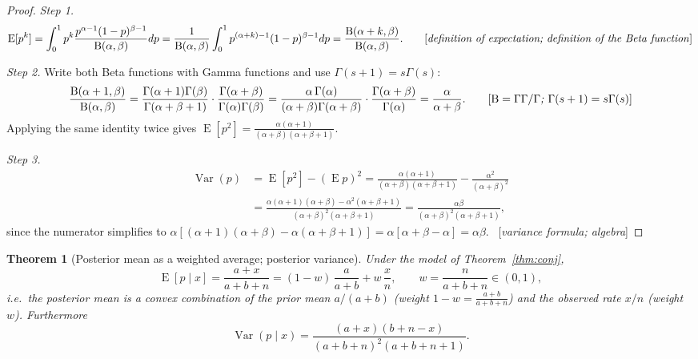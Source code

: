 \documentclass[11pt]{article}
\newtheorem{theorem}{Theorem}
\theoremstyle{definition}
\theoremstyle{remark}
\newcommand{\E}{\operatorname{E}}
\newcommand{\Var}{\operatorname{Var}}
\newcommand{\Bfun}{\mathrm{B}}
\newcommand{\rulename}[1]{\ {[\emph{#1}]}}
\begin{document}
\begin{proof}
\emph{Step 1.}
\[
\E[p^k]=\int_0^1 p^k\frac{p^{\alpha-1}(1-p)^{\beta-1}}{\Bfun(\alpha,\beta)}dp
=\frac{1}{\Bfun(\alpha,\beta)}\int_0^1 p^{(\alpha+k)-1}(1-p)^{\beta-1}dp=\frac{\Bfun(\alpha+k,\beta)}{\Bfun(\alpha,\beta)}.
\tag*{[\emph{definition of expectation; definition of the Beta function}]}
\]

\emph{Step 2.} Write both Beta functions with Gamma functions and use $\Gamma(s+1)=s\Gamma(s)$:
\[
\frac{\Bfun(\alpha+1,\beta)}{\Bfun(\alpha,\beta)}
=\frac{\Gamma(\alpha+1)\Gamma(\beta)}{\Gamma(\alpha+\beta+1)}\cdot\frac{\Gamma(\alpha+\beta)}{\Gamma(\alpha)\Gamma(\beta)}
=\frac{\alpha\,\Gamma(\alpha)}{(\alpha+\beta)\Gamma(\alpha+\beta)}\cdot\frac{\Gamma(\alpha+\beta)}{\Gamma(\alpha)}
=\frac{\alpha}{\alpha+\beta}.
\tag*{[\emph{$\Bfun=\Gamma\Gamma/\Gamma$; $\Gamma(s+1)=s\Gamma(s)$}]}
\]
Applying the same identity twice gives $\E[p^2]=\frac{\alpha(\alpha+1)}{(\alpha+\beta)(\alpha+\beta+1)}$.

\emph{Step 3.}
\begin{align*}
\Var(p)&=\E[p^2]-(\E p)^2
=\frac{\alpha(\alpha+1)}{(\alpha+\beta)(\alpha+\beta+1)}-\frac{\alpha^2}{(\alpha+\beta)^2}\\
&=\frac{\alpha(\alpha+1)(\alpha+\beta)-\alpha^2(\alpha+\beta+1)}{(\alpha+\beta)^2(\alpha+\beta+1)}
=\frac{\alpha\beta}{(\alpha+\beta)^2(\alpha+\beta+1)},
\end{align*}
since the numerator simplifies to $\alpha[(\alpha+1)(\alpha+\beta)-\alpha(\alpha+\beta+1)]=\alpha[\alpha+\beta-\alpha]=\alpha\beta$.
\rulename{variance formula; algebra}
\end{proof}

\begin{theorem}[Posterior mean as a weighted average; posterior variance]\label{thm:mean}
Under the model of Theorem~\ref{thm:conj},
\[
\E[p\mid x]=\frac{a+x}{a+b+n}=(1-w)\,\frac{a}{a+b}+w\,\frac{x}{n},
\qquad w=\frac{n}{a+b+n}\in(0,1),
\]
i.e.\ the posterior mean is a convex combination of the prior mean $a/(a+b)$ (weight $1-w=\frac{a+b}{a+b+n}$)
and the observed rate $x/n$ (weight $w$). Furthermore
\[
\Var(p\mid x)=\frac{(a+x)(b+n-x)}{(a+b+n)^2(a+b+n+1)} .
\]
\end{theorem}
\end{document}
